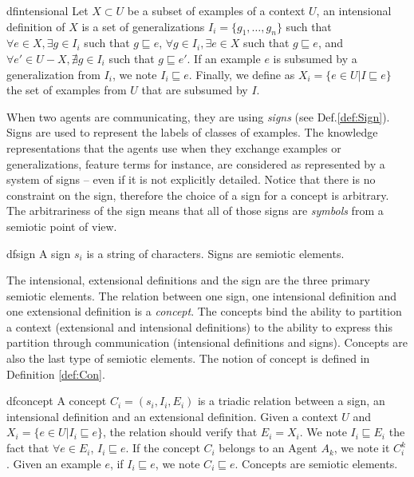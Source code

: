 \begin{restatable}{df}{intensional}
\label{def:IntD}
Let $X \subset U$ be a subset of examples of a context $U$, an intensional definition of $X$ is a set of generalizations $I_{i} = \{ g_{1}, \ldots , g_{n} \}$ such that $\forall e \in X, \exists g \in I_{i}$ such that $g \sqsubseteq e$, $\forall g \in I_{i}, \exists e \in X$ such that $g \sqsubseteq e$, and $\forall e' \in U-X, \nexists g \in I_{i}$ such that $g \sqsubseteq e'$. If an example $e$ is subsumed by a generalization from $I_{i}$, we note $I_{i} \sqsubseteq e$. Finally, we define as $X_{i} = \{ e \in U | I \sqsubseteq e \}$ the set of examples from $U$ that are subsumed by $I$.
\end{restatable}

When two agents are communicating, they are using \emph{signs} (see Def.\ref{def:Sign}). Signs are used to represent the labels of classes of examples. The knowledge representations that the agents use when they exchange examples or generalizations, feature terms for instance, are considered as represented by a system of signs -- even if it is not explicitly detailed. Notice that there is no constraint on the sign, therefore the choice of a sign for a concept is arbitrary. The arbitrariness of the sign means that all of those signs are \emph{symbols} from a semiotic point of view.

\begin{restatable}[Sign]{df}{sign}
\label{def:Sign}
A sign $s_{i}$ is a string of characters. Signs are semiotic elements.
\end{restatable}

The intensional, extensional definitions and the sign are the three primary semiotic elements. The relation between one sign, one intensional definition and one extensional definition is a \emph{concept}. The concepts bind the ability to partition a context (extensional and intensional definitions) to the ability to express this partition through communication (intensional definitions and signs). Concepts are also the last type of semiotic elements. The notion of concept is defined in Definition \ref{def:Con}.

\begin{restatable}[Concept]{df}{concept}
\label{def:Con}
A concept $C_{i} = (s_{i}, I_{i}, E_{i})$ is a triadic relation between a sign, an intensional definition and an extensional definition. Given a context $U$ and $X_{i} = \{ e \in U | I_{i} \sqsubseteq e \}$, the relation should verify that $E_{i} = X_{i}$. We note $I_{i} \sqsubseteq E_{i}$ the fact that $\forall e \in E_{i}$, $I_{i} \sqsubseteq e$. If the concept $C_{i}$ belongs to an Agent $A_{k}$, we note it $C_{i}^{k}$. Given an example $e$, if $I_{i} \sqsubseteq e$, we note $C_{i} \sqsubseteq e$. Concepts are semiotic elements.
\end{restatable}

